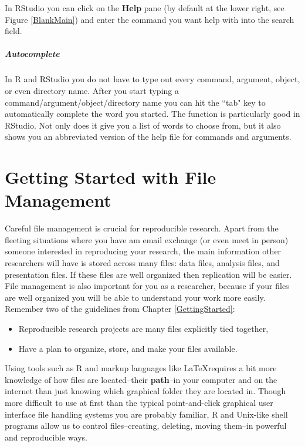 \documentclass[ChapterTOCs,krantz1]{krantz}\usepackage{graphicx, color}
\begin{document}
\noindent In RStudio you can click on the {\bf{Help}} pane (by default at the lower right, see Figure \ref{BlankMain}) and enter the command you want help with into the search field.

\paragraph{Autocomplete}

In R and RStudio you do not have to type out every command, argument, object, or even directory name. After you start typing a command/argument/object/directory name you can hit the ``tab" key to automatically complete the word you started. The  function is particularly good in RStudio. Not only does it give you a list of words to choose from, but it also shows you an abbreviated version of the help file for commands and arguments.






\chapter{Getting Started with File Management}\label{DirectoriesChapter}

Careful file management is crucial for reproducible research. Apart from the fleeting situations where you have am email exchange (or even meet in person) someone interested in reproducing your research, the main information other researchers will have is stored across many files: data files, analysis files, and presentation files. If these files are well organized then replication will be easier. File management is also important for you as a researcher, because if your files are well organized you will be able to understand your work more easily. Remember two of the guidelines from Chapter \ref{GettingStarted}:

\begin{itemize}
    \item Reproducible research projects are many files explicitly tied together,
    \item Have a plan to organize, store, and make your files available. 
\end{itemize}

Using tools such as R and markup languages like \LaTeX requires a bit more knowledge of how files are located--their {\bf{path}}--in your computer and on the internet than just knowing which graphical folder they are located in. Though more difficult to use at first than the typical point-and-click graphical user interface file handling systems you are probably familiar, R and Unix-like shell programs allow us to control files--creating, deleting, moving them--in powerful and reproducible ways. 
\end{document}
